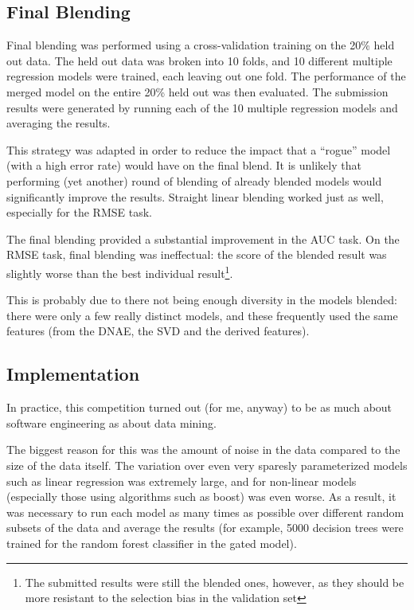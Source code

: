 \documentclass{article}
\begin{document}
\subsection{Final Blending}

Final blending was performed using a cross-validation training on the 20\% held out data.  The held out data was broken into 10 folds, and 10 different multiple regression models were trained, each leaving out one fold.  The performance of the merged model on the entire 20\% held out was then evaluated.  The submission results were generated by running each of the 10 multiple regression models and averaging the results.

This strategy was adapted in order to reduce the impact that a ``rogue'' model (with a high error rate) would have on the final blend.  It is unlikely that performing (yet another) round of blending of already blended models would significantly improve the results.  Straight linear blending worked just as well, especially for the RMSE task.

The final blending provided a substantial improvement in the AUC task.  On the RMSE task, final blending was ineffectual: the score of the blended result was slightly worse than the best individual result\footnote{The submitted results were still the blended ones, however, as they should be more resistant to the selection bias in the validation set}.

This is probably due to there not being enough diversity in the models blended: there were only a few really distinct models, and these frequently used the same features (from the DNAE, the SVD and the derived features).

\subsection{Implementation}

In practice, this competition turned out (for me, anyway) to be as much about software engineering as about data mining.

The biggest reason for this was the amount of noise in the data compared to the size of the data itself.  The variation over even very sparesly parameterized models such as linear regression was extremely large, and for non-linear models (especially those using algorithms such as boost) was even worse.  As a result, it was necessary to run each model as many times as possible over different random subsets of the data and average the results (for example, 5000 decision trees were trained for the random forest classifier in the gated model).
\end{document}
